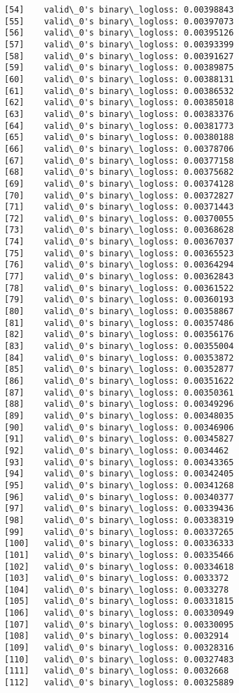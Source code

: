 \documentclass[11pt]{article}
\begin{document}
\begin{Verbatim}[commandchars=\\\{\}]
[54]	valid\_0's binary\_logloss: 0.00398843
[55]	valid\_0's binary\_logloss: 0.00397073
[56]	valid\_0's binary\_logloss: 0.00395126
[57]	valid\_0's binary\_logloss: 0.00393399
[58]	valid\_0's binary\_logloss: 0.00391627
[59]	valid\_0's binary\_logloss: 0.00389875
[60]	valid\_0's binary\_logloss: 0.00388131
[61]	valid\_0's binary\_logloss: 0.00386532
[62]	valid\_0's binary\_logloss: 0.00385018
[63]	valid\_0's binary\_logloss: 0.00383376
[64]	valid\_0's binary\_logloss: 0.00381773
[65]	valid\_0's binary\_logloss: 0.00380188
[66]	valid\_0's binary\_logloss: 0.00378706
[67]	valid\_0's binary\_logloss: 0.00377158
[68]	valid\_0's binary\_logloss: 0.00375682
[69]	valid\_0's binary\_logloss: 0.00374128
[70]	valid\_0's binary\_logloss: 0.00372827
[71]	valid\_0's binary\_logloss: 0.00371443
[72]	valid\_0's binary\_logloss: 0.00370055
[73]	valid\_0's binary\_logloss: 0.00368628
[74]	valid\_0's binary\_logloss: 0.00367037
[75]	valid\_0's binary\_logloss: 0.00365523
[76]	valid\_0's binary\_logloss: 0.00364294
[77]	valid\_0's binary\_logloss: 0.00362843
[78]	valid\_0's binary\_logloss: 0.00361522
[79]	valid\_0's binary\_logloss: 0.00360193
[80]	valid\_0's binary\_logloss: 0.00358867
[81]	valid\_0's binary\_logloss: 0.00357486
[82]	valid\_0's binary\_logloss: 0.00356176
[83]	valid\_0's binary\_logloss: 0.00355004
[84]	valid\_0's binary\_logloss: 0.00353872
[85]	valid\_0's binary\_logloss: 0.00352877
[86]	valid\_0's binary\_logloss: 0.00351622
[87]	valid\_0's binary\_logloss: 0.00350361
[88]	valid\_0's binary\_logloss: 0.00349296
[89]	valid\_0's binary\_logloss: 0.00348035
[90]	valid\_0's binary\_logloss: 0.00346906
[91]	valid\_0's binary\_logloss: 0.00345827
[92]	valid\_0's binary\_logloss: 0.0034462
[93]	valid\_0's binary\_logloss: 0.00343365
[94]	valid\_0's binary\_logloss: 0.00342405
[95]	valid\_0's binary\_logloss: 0.00341268
[96]	valid\_0's binary\_logloss: 0.00340377
[97]	valid\_0's binary\_logloss: 0.00339436
[98]	valid\_0's binary\_logloss: 0.00338319
[99]	valid\_0's binary\_logloss: 0.00337265
[100]	valid\_0's binary\_logloss: 0.00336333
[101]	valid\_0's binary\_logloss: 0.00335466
[102]	valid\_0's binary\_logloss: 0.00334618
[103]	valid\_0's binary\_logloss: 0.0033372
[104]	valid\_0's binary\_logloss: 0.0033278
[105]	valid\_0's binary\_logloss: 0.00331815
[106]	valid\_0's binary\_logloss: 0.00330949
[107]	valid\_0's binary\_logloss: 0.00330095
[108]	valid\_0's binary\_logloss: 0.0032914
[109]	valid\_0's binary\_logloss: 0.00328316
[110]	valid\_0's binary\_logloss: 0.00327483
[111]	valid\_0's binary\_logloss: 0.0032668
[112]	valid\_0's binary\_logloss: 0.00325889

\end{Verbatim}
\end{document}
